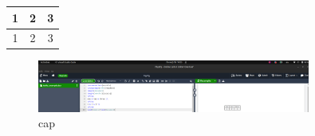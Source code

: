 \documentclass{article}
\begin{document}
\begin{tabular}{c | c | c}
\hline
1 & 2 & 3 \\
\hline
1 & 2 & 3 \\
\hline
\end{tabular}
\begin{figure}[h]
    \centering
    \includegraphics[width=0.8\textwidth]{hw_2/artifacts/image.png}
    \caption{cap}
    \label{label}
\end{figure}
\end{document}
